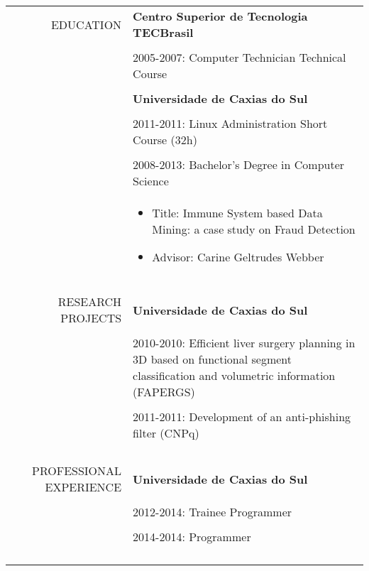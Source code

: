 \documentclass[a4paper, 10pt]{article}
\begin{document}
    \begin{tabular}{rp{13cm}}
        EDUCATION
        & \bf Centro Superior de Tecnologia TECBrasil \\\\
        & 2005-2007: Computer Technician Technical Course \\\\
        & \bf Universidade de Caxias do Sul \\\\
        & 2011-2011: Linux Administration Short Course (32h) \\\\
        & 2008-2013: Bachelor's Degree in Computer Science \\
        & \begin{itemize}
            \vspace{-5mm}
            \itemsep-1mm
            \item Title:
                Immune System based Data Mining: a case study on Fraud
                Detection
            \item Advisor: Carine Geltrudes Webber
        \end{itemize} \\\\
        \hline \\\\
        RESEARCH PROJECTS
        & \bf Universidade de Caxias do Sul \\\\
        & 2010-2010:
            Efficient liver surgery planning in 3D based on functional segment
            classification and volumetric information (FAPERGS) \\\\
        & 2011-2011: Development of an anti-phishing filter (CNPq) \\\\\\
        \hline \\\\
        PROFESSIONAL EXPERIENCE
        & \bf Universidade de Caxias do Sul \\\\
        & 2012-2014: Trainee Programmer \\\\
        & 2014-2014: Programmer \\\\\\
        \hline \\\\

\end{tabular}
\end{document}
